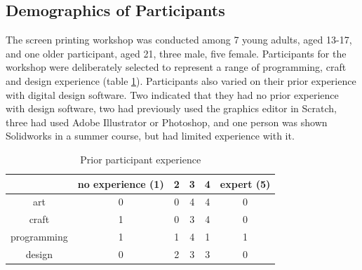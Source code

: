 \documentclass{sigchi}
\newcommand\tabhead[1]{\small\textbf{#1}}
\begin{document}
\subsection{Demographics of Participants}
The screen printing workshop was conducted among 7 young adults, aged 13-17, and one older participant, aged 21, three male, five female. Participants for the workshop were deliberately selected to represent a range of programming, craft and design experience (table \ref{table:experience}). Participants also varied on their prior experience with digital design software. Two indicated that they had no prior experience with design software, two had previously used the graphics editor in Scratch, three had used Adobe Illustrator or Photoshop, and one person was shown Solidworks in a summer course, but had limited experience with it.
\begin{table}
  \centering
  \begin{tabular}{|c|c|c|c|c|c|}
    \hline
    \multicolumn{1}{|p{0.75cm}|}{\centering\tabhead{}} &
    \multicolumn{1}{|p{1.3cm}|}{\centering\small{no experience (1)}} &
    \multicolumn{1}{|p{0.75cm}|}{\centering\small{2}}&
    \multicolumn{1}{|p{0.75cm}|}{\centering\small{3}}&
    \multicolumn{1}{|p{0.75cm}|}{\centering\small{4}}&
    \multicolumn{1}{|p{0.75cm}|}{\centering\small{expert (5)}}\\
    \hline
    \small{art} & 0 & 0 & 4 & 4 & 0\\
    \hline
    \small{craft} & 1 & 0 & 3 & 4& 0  \\
    \hline
	\small{programming} & 1 & 1 & 4 & 1& 1  \\
    \hline
	\small{design} & 0 & 2 & 3 & 3& 0  \\
    \hline
  \end{tabular}
  \caption{Prior participant experience}
\label{table:experience}
\end{table}
\end{document}
